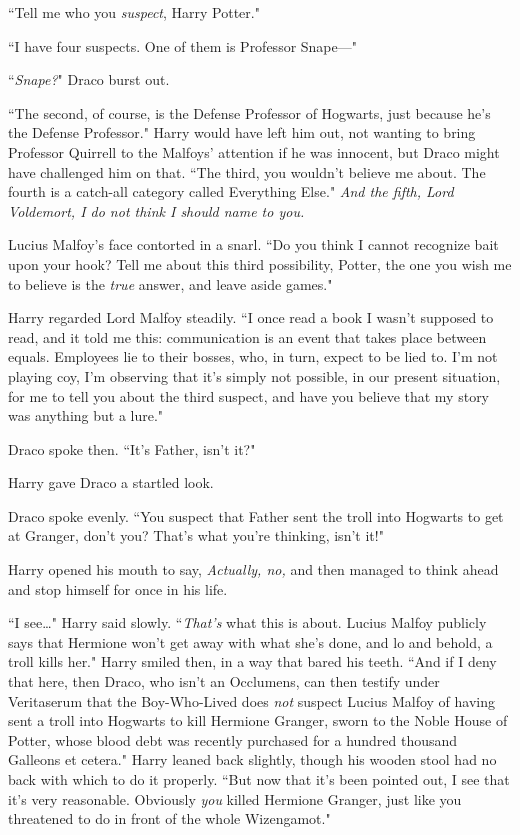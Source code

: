 ``Tell me who you \emph{suspect}, Harry Potter."

``I have four suspects. One of them is Professor Snape—"

``\emph{Snape?}" Draco burst out.

``The second, of course, is the Defense Professor of Hogwarts, just because he's the Defense Professor." Harry would have left him out, not wanting to bring Professor Quirrell to the Malfoys' attention if he was innocent, but Draco might have challenged him on that. ``The third, you wouldn't believe me about. The fourth is a catch-all category called Everything Else." \emph{And the fifth, Lord Voldemort, I do not think I should name to you.}

Lucius Malfoy's face contorted in a snarl. ``Do you think I cannot recognize bait upon your hook? Tell me about this third possibility, Potter, the one you wish me to believe is the \emph{true} answer, and leave aside games."

Harry regarded Lord Malfoy steadily. ``I once read a book I wasn't supposed to read, and it told me this: communication is an event that takes place between equals. Employees lie to their bosses, who, in turn, expect to be lied to. I'm not playing coy, I'm observing that it's simply not possible, in our present situation, for me to tell you about the third suspect, and have you believe that my story was anything but a lure."

Draco spoke then. ``It's Father, isn't it?"

Harry gave Draco a startled look.

Draco spoke evenly. ``You suspect that Father sent the troll into Hogwarts to get at Granger, don't you? That's what you're thinking, isn't it!"

Harry opened his mouth to say, \emph{Actually, no,} and then managed to think ahead and stop himself for once in his life.

``I see{\ldots}" Harry said slowly. ``\emph{That's} what this is about. Lucius Malfoy publicly says that Hermione won't get away with what she's done, and lo and behold, a troll kills her." Harry smiled then, in a way that bared his teeth. ``And if I deny that here, then Draco, who isn't an Occlumens, can then testify under Veritaserum that the Boy-Who-Lived does \emph{not} suspect Lucius Malfoy of having sent a troll into Hogwarts to kill Hermione Granger, sworn to the Noble House of Potter, whose blood debt was recently purchased for a hundred thousand Galleons et cetera." Harry leaned back slightly, though his wooden stool had no back with which to do it properly. ``But now that it's been pointed out, I see that it's very reasonable. Obviously \emph{you} killed Hermione Granger, just like you threatened to do in front of the whole Wizengamot."

